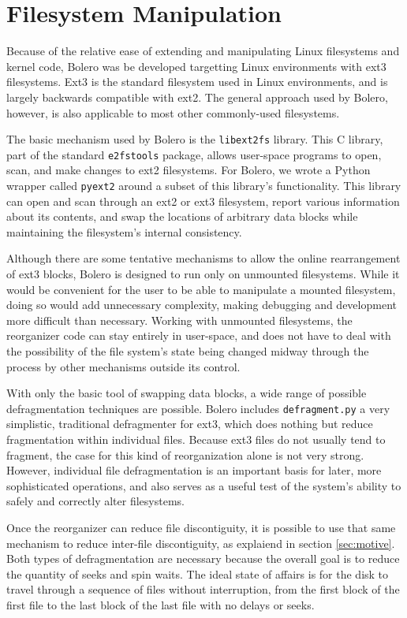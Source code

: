 \documentclass[10pt,twocolumn,letterpaper]{article}
\begin{document}
\section{Filesystem Manipulation}

Because of the relative ease of extending and manipulating Linux filesystems and
kernel code, Bolero was be developed targetting Linux environments with ext3
filesystems. Ext3 is the standard filesystem used in Linux
environments, and is largely backwards compatible with ext2\cite{ext2journal}.
The general approach used by Bolero, however, is also applicable to most other commonly-used
filesystems.

The basic mechanism used by Bolero is the \texttt{libext2fs} library. This C
library, part of the standard \texttt{e2fstools} package, allows user-space programs
to open, scan, and make changes to ext2 filesystems. For Bolero, we wrote
a Python wrapper called \texttt{pyext2} around a subset of this library's functionality.
This library can open and scan through an ext2 or ext3 filesystem, report
various information about its contents, and swap the locations of arbitrary data
blocks while maintaining the filesystem's internal consistency.

Although there are some tentative mechanisms to allow the online rearrangement
of ext3 blocks\cite{ext3online}, Bolero is designed to run only on unmounted filesystems.
While it would be
convenient for the user to be able to manipulate a mounted filesystem, doing so
would add unnecessary complexity, making debugging and
development more difficult than necessary. Working with unmounted filesystems,
the reorganizer code can stay entirely in user-space, and does not have
to deal with the possibility of the file system's state being changed
midway through the process by other mechanisms outside its control.

With only the basic tool of swapping data blocks, a wide range of possible
defragmentation techniques are possible. Bolero includes \texttt{defragment.py}
a very simplistic, traditional defragmenter for ext3, which
does nothing but reduce fragmentation within individual files. Because ext3 files do
not usually tend to fragment, the case for this kind of reorganization alone
is not very strong. However, individual file defragmentation is an important
basis for later, more sophisticated operations, and also serves as a useful test
of the system's ability to safely and correctly alter filesystems.

Once the reorganizer can reduce file discontiguity, it is possible to
use that same mechanism to reduce inter-file discontiguity, as explaiend
in section \ref{sec:motive}. Both types of defragmentation are necessary because the overall goal is to reduce the quantity of seeks and spin waits. The ideal state of affairs is for the disk to travel through
a sequence of files without interruption\cite{autolocality}, from the first block of the first file to the last
block of the last file with no delays or seeks.
\end{document}
